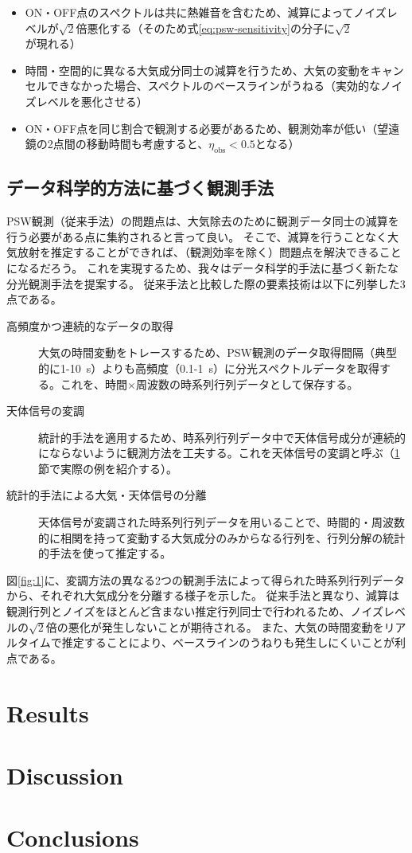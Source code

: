\documentclass[a4paper,10pt,oneside,twocolumn,notitlepage,final]{jarticle}
\newcommand{\subrm}[1]{_{\mathrm{#1}}}
\begin{document}
\begin{itemize}
    \item ON・OFF点のスペクトルは共に熱雑音を含むため、減算によってノイズレベルが$\sqrt{2}$倍悪化する（そのため式\ref{eq:psw-sensitivity}の分子に$\sqrt{2}$が現れる）
    \item 時間・空間的に異なる大気成分同士の減算を行うため、大気の変動をキャンセルできなかった場合、スペクトルのベースラインがうねる（実効的なノイズレベルを悪化させる）
    \item ON・OFF点を同じ割合で観測する必要があるため、観測効率が低い（望遠鏡の2点間の移動時間も考慮すると、$\eta\subrm{obs}<0.5$となる）
\end{itemize}


\subsection{データ科学的方法に基づく観測手法}

PSW観測（従来手法）の問題点は、大気除去のために観測データ同士の減算を行う必要がある点に集約されると言って良い。
そこで、減算を行うことなく大気放射を推定することができれば、（観測効率を除く）問題点を解決できることになるだろう。
これを実現するため、我々はデータ科学的手法に基づく新たな分光観測手法を提案する。
従来手法と比較した際の要素技術は以下に列挙した3点である。

\begin{description}
    \item[高頻度かつ連続的なデータの取得] 大気の時間変動をトレースするため、PSW観測のデータ取得間隔（典型的に1-10~s）よりも高頻度（0.1-1~s）に分光スペクトルデータを取得する。これを、時間$\times$周波数の時系列行列データとして保存する。
    \item[天体信号の変調] 統計的手法を適用するため、時系列行列データ中で天体信号成分が連続的にならないように観測方法を工夫する。これを天体信号の変調と呼ぶ（\ref{s:results}節で実際の例を紹介する）。
    \item[統計的手法による大気・天体信号の分離] 天体信号が変調された時系列行列データを用いることで、時間的・周波数的に相関を持って変動する大気成分のみからなる行列を、行列分解の統計的手法を使って推定する。
\end{description}

図\ref{fig:1}に、変調方法の異なる2つの観測手法によって得られた時系列行列データから、それぞれ大気成分を分離する様子を示した。
従来手法と異なり、減算は観測行列とノイズをほとんど含まない推定行列同士で行われるため、ノイズレベルの$\sqrt{2}$倍の悪化が発生しないことが期待される。
また、大気の時間変動をリアルタイムで推定することにより、ベースラインのうねりも発生しにくいことが利点である。
\section{Results}
\label{s:results}


\section{Discussion}
\label{s:discussion}


\section{Conclusions}

\small
\begin{thebibliography}{99}
\end{thebibliography}
\end{document}
